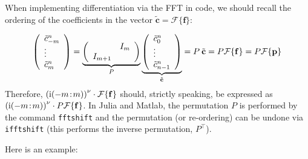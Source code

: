 \documentclass[12pt,landscape]{article}
\begin{document}
{When implementing differentiation via the FFT in code, we should recall the ordering of the coefficients in the vector $\tilde{\mathbf{c}} = \mathcal{F}\lbrace \mathbf{f}  \rbrace$:

\[
\left(
\begin{array}{l}
\tilde{c}^n_{-m} \\
\vdots \\
\tilde{c}^n_{m}
\end{array}
\right) = 
\underbrace{\left(
\begin{array}{c c}
   & I_{m} \\
I_{m+1} & 
\end{array}
\right)}_{P}
\underbrace{\left(
\begin{array}{l}
\tilde{c}^n_{0} \\
\vdots \\
\tilde{c}^n_{n-1}
\end{array}
\right)}_{\tilde{\mathbf{c}}} = P\: \tilde{\mathbf{c}} = P\mathcal{F}\lbrace \mathbf{f}  \rbrace = P\mathcal{F}\lbrace \mathbf{p}\rbrace
\]
Therefore, $\left({\rm i}(-m\!:\!m)\right)^{\nu}\cdot\mathcal{F}\lbrace  \mathbf{f} \rbrace$ should, strictly speaking, be expressed as $\left({\rm i}(-m\!:\!m)\right)^{\nu}\cdot P\mathcal{F}\lbrace  \mathbf{f} \rbrace$.  In Julia and Matlab, the permutation $P$ is performed by the command \texttt{fftshift} and the permutation (or re-ordering) can be undone via \texttt{ifftshift} (this performs the inverse permutation, $P^{\top}$).

Here is an example:


}
\end{document}
